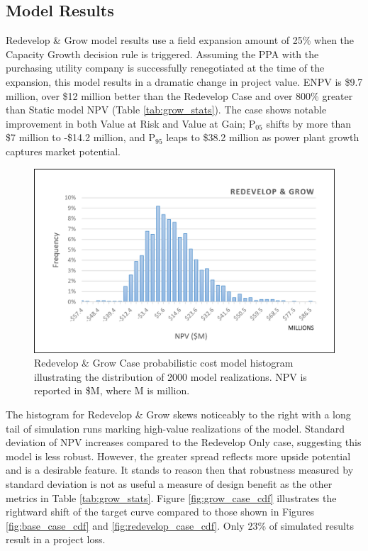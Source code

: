 \subsection{Model Results}
\label{ch6:grow_results}

Redevelop \& Grow model results use a field expansion amount of 25\% when the Capacity Growth decision rule is triggered. Assuming the PPA with the purchasing utility company is successfully renegotiated at the time of the expansion, this model results in a dramatic change in project value. ENPV is \$9.7 million, over \$12 million better than the Redevelop Case and over 800\% greater than Static model NPV (Table \ref{tab:grow_stats}). The case shows notable improvement in both Value at Risk and Value at Gain; P$_{05}$ shifts by more than \$7 million to -\$14.2 million, and P$_{95}$ leaps to \$38.2 million as power plant growth captures market potential.

\begin{figure}[!htp]
\centering
\includegraphics[width=.85\textwidth]{templates/images/Figure-Grow_Case_Histogram.png}
\caption[Redevelop \& Grow Case histogram]{Redevelop \& Grow Case probabilistic cost model histogram illustrating the distribution of 2000 model realizations. NPV is reported in \$M, where M is million.}
\label{fig:grow_case_hist}
\end{figure}

The histogram for Redevelop \& Grow skews noticeably to the right with a long tail of simulation runs marking high-value realizations of the model. Standard deviation of NPV increases compared to the Redevelop Only case, suggesting this model is less robust. However, the greater spread reflects more upside potential and is a desirable feature. It stands to reason then that robustness measured by standard deviation is not as useful a measure of design benefit as the other metrics in Table \ref{tab:grow_stats}. Figure \ref{fig:grow_case_cdf} illustrates the rightward shift of the target curve compared to those shown in Figures \ref{fig:base_case_cdf} and \ref{fig:redevelop_case_cdf}. Only 23\% of simulated results result in a project loss. 

